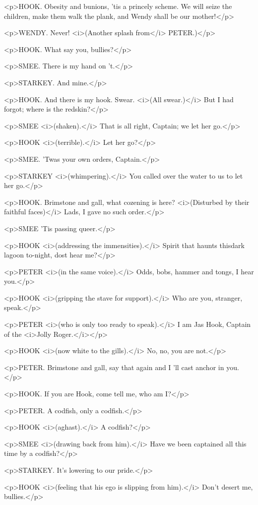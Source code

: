 <p>HOOK. Obesity and bunions, 'tis a princely scheme. We will seize
the children, make them walk the plank, and Wendy shall be our
mother!</p>

<p>WENDY. Never! <i>(Another splash from</i> PETER.)</p>

<p>HOOK. What say you, bullies?</p>

<p>SMEE. There is my hand on 't.</p>

<p>STARKEY. And mine.</p>

<p>HOOK. And there is my hook. Swear. <i>(All swear.)</i> But I had
forgot; where is the redskin?</p>

<p>SMEE <i>(shaken).</i> That is all right, Captain; we let her
go.</p>

<p>HOOK <i>(terrible).</i> Let her go?</p>

<p>SMEE. 'Twas your own orders, Captain.</p>

<p>STARKEY <i>(whimpering).</i> You called over the water to us to
let her go.</p>

<p>HOOK. Brimstone and gall, what cozening is here? <i>(Disturbed by
their faithful faces)</i> Lads, I gave no such order.</p>

<p>SMEE 'Tis passing queer.</p>

<p>HOOK <i>(addressing the immensities).</i> Spirit that haunts
thisdark lagoon to-night, dost hear me?</p>

<p>PETER <i>(in the same voice).</i> Odds, bobs, hammer and tongs, I
hear you.</p>

<p>HOOK <i>(gripping the stave for support).</i> Who are you,
stranger, speak.</p>

<p>PETER <i>(who is only too ready to speak).</i> I am Jas Hook,
Captain of the <i>Jolly Roger.</i></p>

<p>HOOK <i>(now white to the gills).</i> No, no, you are not.</p>

<p>PETER. Brimstone and gall, say that again and I 'll cast anchor in
you.</p>

<p>HOOK. If you are Hook, come tell me, who am I?</p>

<p>PETER. A codfish, only a codfish.</p>

<p>HOOK <i>(aghast).</i> A codfish?</p>

<p>SMEE <i>(drawing back from him).</i> Have we been captained all
this time by a codfish?</p>

<p>STARKEY. It's lowering to our pride.</p>

<p>HOOK <i>(feeling that his ego is slipping from him).</i> Don't
desert me, bullies.</p>

